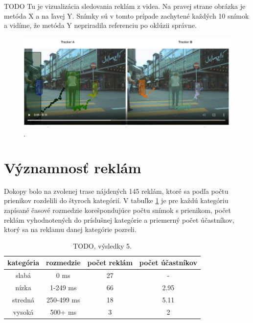 TODO Tu je vizualizácia sledovania reklám z videa. Na pravej strane obrázka je metóda X a na ľavej Y. Snímky sú v tomto prípade zachytené každých 10 snímok a vidíme, že metóda Y nepriradila referenciu po oklúzii správne.
\begin{figure}[ht]
    \centering
    \includegraphics[width=1\textwidth]{images/05/vs.png}
    \caption{.}
    \label{img:road}
\end{figure}

\section{Významnosť reklám}

Dokopy bolo na zvolenej trase nájdených 145 reklám, ktoré sa podľa počtu prienikov rozdelili do štyroch kategórií. V tabuľke \ref{table:cat} je pre každú kategóriu zapísané časové rozmedzie korešpondujúce počtu snímok s prienikom, počet reklám vyhodnotených do príslušnej kategórie a priemerný počet účastníkov, ktorý sa na reklamu danej kategórie pozreli.
\\
\begin{table}[ht]
\centering
\begin{tabular}{|c c c c|}
 \hline
 kategória &	rozmedzie &	počet reklám &	počet účastníkov \\ [0.5ex]
 \hline
slabá &	0 ms &	27 &	- \\ [0.1ex]
nízka &	1-249 ms &	66 &	2.95 \\ [0.1ex]
stredná &	250-499 ms &	18 &	5.11 \\ [0.1ex]
vysoká &	500+ ms &	3 &	2 \\ [0.1ex]
 \hline
\end{tabular}
\caption{TODO, výsledky 5.}
\label{table:cat}
\end{table}

